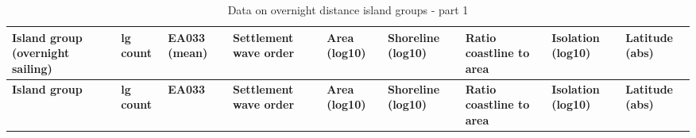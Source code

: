 \documentclass[a4paper,10pt]{article} %
\begin{document}
\begin{landscape}
\begin{longtable}{| p{2.6cm} |  p{1cm} | p{1.2cm}  | p{1.9cm}  | p{1.7cm}  | p{1.7cm}  | p{1.7cm}  | p{1.6cm} | p{1.5cm}   |}
\caption{{Data on overnight distance island groups - part 1}} 
\label{overnight_groups_table} \\

\hline
\textbf{Island group (overnight sailing)} & \textbf{lg  count } & \textbf{EA033 (mean)} & \textbf{Settlement wave order} & \textbf{Area (log10)} & \textbf{Shoreline (log10)} & \textbf{Ratio coastline to  area} & \textbf{Isolation (log10)} & \textbf{Latitude (abs)}  \\ \hline

\endfirsthead

\hline
\textbf{Island group} & \textbf{lg  count } & \textbf{EA033} & \textbf{Settlement wave order} & \textbf{Area (log10)} & \textbf{Shoreline (log10)} & \textbf{Ratio coastline to  area} & \textbf{Isolation (log10)} & \textbf{Latitude (abs)}  \\ \hline
\endhead


\end{longtable}
\end{landscape}
\end{document}
